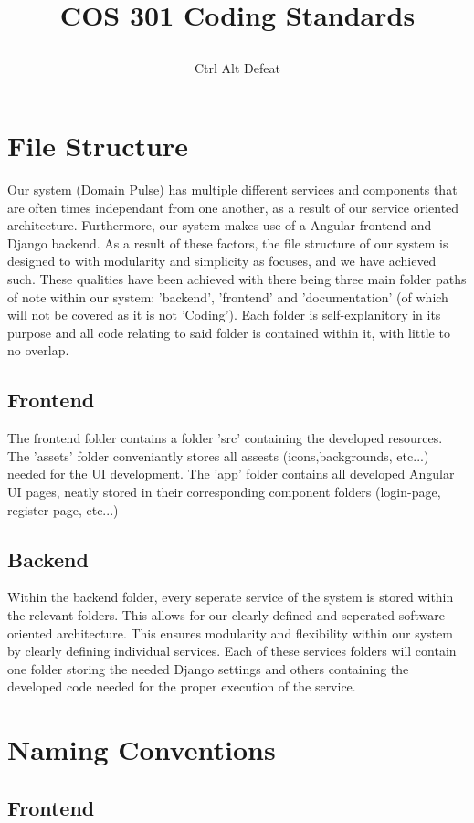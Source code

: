 \documentclass[12pt]{article}
\title{

\\
{COS 301 Coding Standards}
}
\author{Ctrl Alt Defeat}
\begin{document}


\tableofcontents

\newpage


\section{File Structure}
Our system (Domain Pulse) has multiple different services and components that are often times independant from one another, as a result of our service oriented architecture. Furthermore, our system makes use of a Angular frontend and Django backend. As a result of these factors, the file structure of our system is designed to with modularity and simplicity as focuses, and we have achieved such. These qualities have been achieved with there being three main folder paths of note within our system: 'backend', 'frontend' and 'documentation' (of which will not be covered as it is not 'Coding'). Each folder is self-explanitory in its purpose and all code relating to said folder is contained within it, with little to no overlap.
\subsection{Frontend}
The frontend folder contains a folder 'src' containing the developed resources. The 'assets' folder conveniantly stores all assests (icons,backgrounds, etc...) needed for the UI development. The 'app' folder contains all developed Angular UI pages, neatly stored in their corresponding component folders (login-page, register-page, etc...)
\subsection{Backend}
Within the backend folder, every seperate service of the system is stored within the relevant folders. This allows for our clearly defined and seperated software oriented architecture. This ensures modularity and flexibility within our system by clearly defining individual services. Each of these services folders will contain one folder storing the needed Django settings and others containing the developed code needed for the proper execution of the service.

\newpage
\section{Naming Conventions}
\subsection{Frontend}
\end{document}
